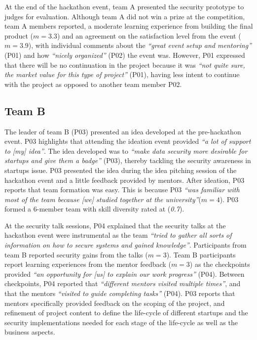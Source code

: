 \documentclass[runningheads]{llncs}
\begin{document}
At the end of the hackathon event, team A presented the security prototype to judges for evaluation. Although team A did not win a prize at the competition, team A members reported, a moderate learning experience from building the final product ($m = 3.3$) and an agreement on the satisfaction level from the event ($m = 3.9$), with individual comments about the \textit{``great event setup and mentoring''} (P01) and how \textit{``nicely organized''} (P02) the event was. However, P01 expressed that there will be no continuation in the project because it was \textit{``not quite sure, the market value for this type of project''} (P01), having less intent to continue with the project as opposed to another team member P02.


\subsection{Team B}
The leader of team B (P03) presented an idea developed at the pre-hackathon event. P03 highlights that attending the ideation event provided \textit{``a lot of support to [my] idea''}. The idea developed was to \textit{``make data security more desirable for startups and give them a badge''} (P03), thereby tackling the security awareness in startups issue. P03 presented the idea during the idea pitching session of the hackathon event and a little feedback provided by mentors. After ideation, P03 reports that team formation was easy. This is because P03 \textit{``was familiar with most of the team because [we] studied together at the university''}($m = 4$). P03 formed a 6-member team with skill diversity rated at (\textit{0.7}).

At the security talk sessions, P04 explained that the security talks at the hackathon event were instrumental as the team \textit{``tried to gather all sorts of information on how to secure systems and gained knowledge''}. Participants from team B reported security gains from the talks ($m = 3$). Team B participants report learning experiences from the mentor feedback ($m = 3$) as the checkpoints provided \textit{``an opportunity for [us] to explain our work progress''} (P04). Between checkpoints, P04 reported that \textit{``different mentors visited multiple times''}, and that the mentors  \textit{``visited to guide completing tasks''} (P04). P03 reports that mentors specifically provided feedback on the scoping of the project, and refinement of project content to define the life-cycle of different startups and the security implementations needed for each stage of the life-cycle as well as the business aspects.
\end{document}
